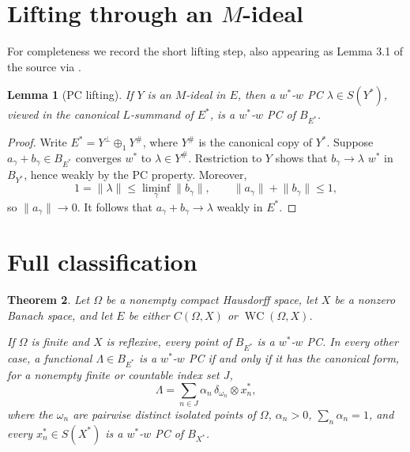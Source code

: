 \documentclass[11pt]{article}
\newtheorem{theorem}{Theorem}
\newtheorem{lemma}[theorem]{Lemma}
\newcommand{\WC}{\operatorname{WC}}
\begin{document}
\section*{Lifting through an $M$-ideal}

For completeness we record the short lifting step, also appearing as Lemma
3.1 of the source via \cite[Theorem 6.2]{dmr}.

\begin{lemma}[PC lifting]\label{lem:lift}
If $Y$ is an $M$-ideal in $E$, then a $w^*$-$w$ PC
$\lambda\in S(Y^*)$, viewed in the canonical $L$-summand of $E^*$, is a
$w^*$-$w$ PC of $B_{E^*}$.
\end{lemma}

\begin{proof}
Write $E^*=Y^\perp\oplus_1Y^\#$, where $Y^\#$ is the canonical copy of
$Y^*$.  Suppose $a_\gamma+b_\gamma\in B_{E^*}$ converges $w^*$ to
$\lambda\in Y^\#$.  Restriction to $Y$ shows that $b_\gamma\to\lambda$
$w^*$ in $B_{Y^*}$, hence weakly by the PC property.  Moreover,
\[
  1=\lVert\lambda\rVert
  \leq\liminf_\gamma\lVert b_\gamma\rVert,
  \qquad
  \lVert a_\gamma\rVert+\lVert b_\gamma\rVert\leq1,
\]
so $\lVert a_\gamma\rVert\to0$.  It follows that
$a_\gamma+b_\gamma\to\lambda$ weakly in $E^*$.
\end{proof}

\section*{Full classification}

\begin{theorem}\label{thm:main}
Let $\Omega$ be a nonempty compact Hausdorff space, let $X$ be a nonzero
Banach space, and let $E$ be either $C(\Omega,X)$ or $\WC(\Omega,X)$.

If $\Omega$ is finite and $X$ is reflexive, every point of $B_{E^*}$ is a
$w^*$-$w$ PC.  In every other case, a functional $\Lambda\in B_{E^*}$ is a
$w^*$-$w$ PC if and only if it has the canonical form, for a nonempty finite
or countable index set $J$,
\begin{equation}\label{eq:canonical}
  \Lambda=\sum_{n\in J}
  \alpha_n\,\delta_{\omega_n}\otimes x_n^*,
\end{equation}
where the $\omega_n$ are pairwise distinct isolated points of $\Omega$,
$\alpha_n>0$, $\sum_n\alpha_n=1$, and every
$x_n^*\in S(X^*)$ is a $w^*$-$w$ PC of $B_{X^*}$.
\end{theorem}
\end{document}

